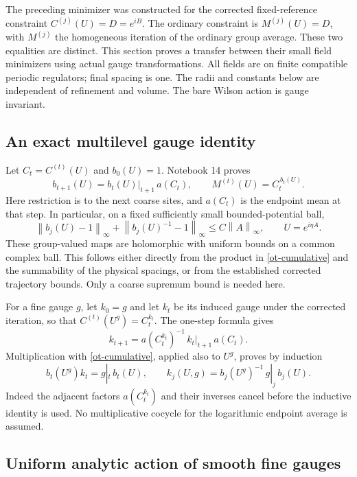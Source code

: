 \documentclass[11pt]{article}
\theoremstyle{remark}
\newcommand{\norm}[1]{\left\|#1\right\|}
\begin{document}
The preceding minimizer was constructed for the corrected
fixed-reference constraint $C^{(j)}(U)=D=e^{iB}$. The ordinary
constraint is $M^{(j)}(U)=D$, with $M^{(j)}$ the homogeneous
iteration of the ordinary group average. These two equalities
are distinct. This section proves a transfer between their small
field minimizers using actual gauge transformations. All fields
are on finite compatible periodic regulators; final spacing is
one. The radii and constants below are independent of refinement
and volume. The bare Wilson action is gauge invariant.

\subsection{An exact multilevel gauge identity}

Let $C_t=C^{(t)}(U)$ and $b_0(U)=1$. Notebook 14 proves
\begin{equation}\label{ot-cumulative}
 b_{t+1}(U)=b_t(U)|_{t+1}\,a(C_t),\qquad
 M^{(t)}(U)=C_t^{\,b_t(U)}.
\end{equation}
Here restriction is to the next coarse sites, and
$a(C_t)$ is the endpoint mean at that step. In particular,
on a fixed sufficiently small bounded-potential ball,
\begin{equation}\label{ot-b-bound}
 \norm{b_j(U)-1}_\infty+\norm{b_j(U)^{-1}-1}_\infty
       \le C\norm{A}_\infty,\qquad U=e^{i\eta A}.
\end{equation}
These group-valued maps are holomorphic with uniform bounds
on a common complex ball. This follows either directly from
the product in \eqref{ot-cumulative} and the summability of
the physical spacings, or from the established corrected
trajectory bounds. Only a coarse supremum bound is needed here.

For a fine gauge $g$, let $k_0=g$ and let $k_t$ be its induced
gauge under the corrected iteration, so that
$C^{(t)}(U^g)=C_t^{k_t}$. The one-step formula gives
\[
 k_{t+1}=a(C_t^{k_t})^{-1}\,k_t|_{t+1}\,a(C_t).
\]
Multiplication with \eqref{ot-cumulative}, applied also to
$U^g$, proves by induction
\begin{equation}\label{ot-exact-induced}
 b_t(U^g)k_t=g|_t\,b_t(U),\qquad
 k_j(U,g)=b_j(U^g)^{-1}\,g|_j\,b_j(U).
\end{equation}
Indeed the adjacent factors $a(C_t^{k_t})$ and their inverses
cancel before the inductive identity is used. No multiplicative
cocycle for the logarithmic endpoint average is assumed.

\subsection{Uniform analytic action of smooth fine gauges}
\end{document}
